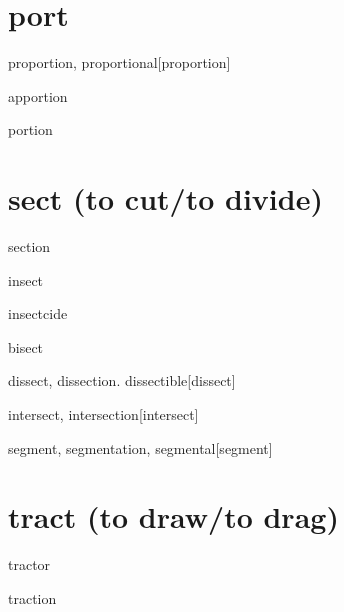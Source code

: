 \section{port}

\begin{wordRef}{proportion, proportional}[proportion]
\end{wordRef}

\begin{wordRef}{apportion}
\end{wordRef}

\begin{wordRef}{portion}
\end{wordRef}

\section{sect (to cut/to divide)}

\begin{wordRef}{section}
\end{wordRef}

\begin{wordRef}{insect}
\end{wordRef}

\begin{wordRef}{insectcide}
\end{wordRef}

\begin{wordRef}{bisect}
\end{wordRef}

\begin{wordRef}{dissect, dissection. dissectible}[dissect]
\end{wordRef}

\begin{wordRef}{intersect, intersection}[intersect]
\end{wordRef}

\begin{wordRef}{segment, segmentation, segmental}[segment]
\end{wordRef}

\section{tract (to draw/to drag)}

\begin{wordRef}{tractor}
\end{wordRef}

\begin{wordRef}{traction}
\end{wordRef}

